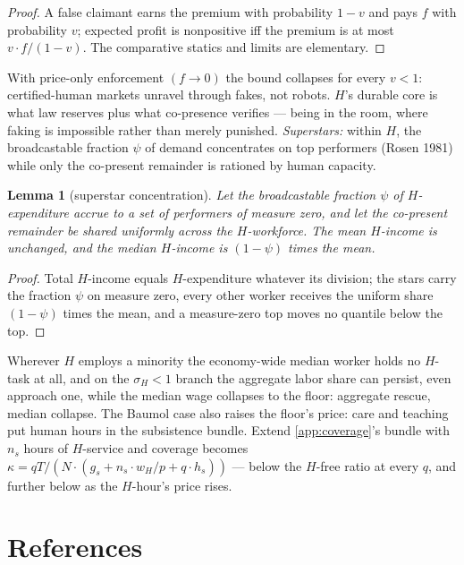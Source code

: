 \documentclass[12pt]{article}
\theoremstyle{plain}
\newtheorem{lemma}[proposition]{Lemma}
\begin{document}
\begin{proof}
A false claimant earns the premium with probability $1 - v$ and pays $f$ with probability $v$; expected profit is nonpositive iff the premium is at most $v\cdot f/(1-v)$. The comparative statics and limits are elementary.
\end{proof}

With price-only enforcement $(f \to 0)$ the bound collapses for every $v < 1$: certified-human markets unravel through fakes, not robots. $H$'s durable core is what law reserves plus what co-presence verifies --- being in the room, where faking is impossible rather than merely punished. \emph{Superstars:} within $H$, the broadcastable fraction $\psi$ of demand concentrates on top performers (Rosen 1981) while only the co-present remainder is rationed by human capacity.

\begin{lemma}[superstar concentration]\label{lem:superstar}
Let the broadcastable fraction $\psi$ of $H$-expenditure accrue to a set of performers of measure zero, and let the co-present remainder be shared uniformly across the $H$-workforce. The mean $H$-income is unchanged, and the median $H$-income is $(1-\psi )$ times the mean.
\end{lemma}

\begin{proof}
Total $H$-income equals $H$-expenditure whatever its division; the stars carry the fraction $\psi$ on measure zero, every other worker receives the uniform share $(1-\psi )$ times the mean, and a measure-zero top moves no quantile below the top.
\end{proof}

Wherever $H$ employs a minority the economy-wide median worker holds no $H$-task at all, and on the $\sigma _H < 1$ branch the aggregate labor share can persist, even approach one, while the median wage collapses to the floor: aggregate rescue, median collapse. The Baumol case also raises the floor's price: care and teaching put human hours in the subsistence bundle. Extend \ref{app:coverage}'s bundle with $n_s$ hours of $H$-service and coverage becomes $\kappa = qT/(N\cdot (g_s + n_s\cdot w_H/p + q\cdot h_s))$ --- below the $H$-free ratio at every $q$, and further below as the $H$-hour's price rises.

\section*{References}
\end{document}
